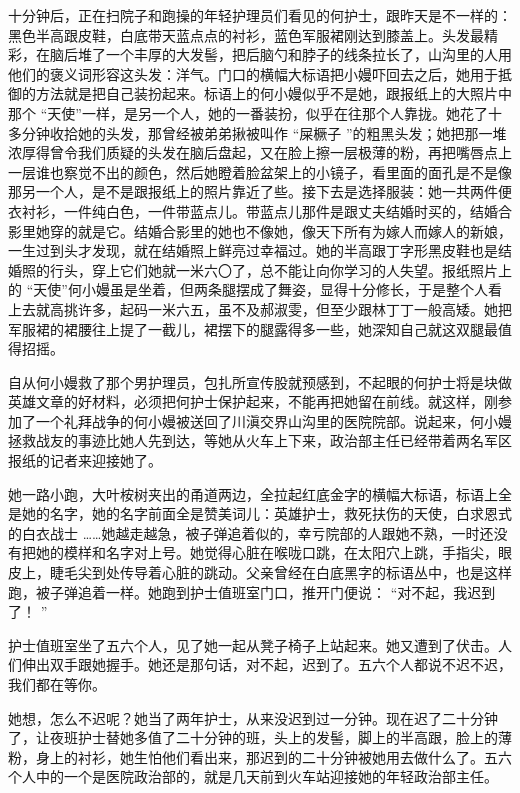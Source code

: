 \documentclass[12pt,twoside,openany]{book}
\begin{document}
十分钟后，正在扫院子和跑操的年轻护理员们看见的何护士，跟昨天是不一样的：黑色半高跟皮鞋，白底带天蓝点点的衬衫，蓝色军服裙刚达到膝盖上。头发最精彩，在脑后堆了一个丰厚的大发髻，把后脑勺和脖子的线条拉长了，山沟里的人用他们的褒义词形容这头发：洋气。门口的横幅大标语把小嫚吓回去之后，她用于抵御的方法就是把自己装扮起来。标语上的何小嫚似乎不是她，跟报纸上的大照片中那个 “天使”一样，是另一个人，她的一番装扮，似乎在往那个人靠拢。她花了十多分钟收拾她的头发，那曾经被弟弟揪被叫作 “屎橛子 ”的粗黑头发；她把那一堆浓厚得曾令我们质疑的头发在脑后盘起，又在脸上擦一层极薄的粉，再把嘴唇点上一层谁也察觉不出的颜色，然后她瞪着脸盆架上的小镜子，看里面的面孔是不是像那另一个人，是不是跟报纸上的照片靠近了些。接下去是选择服装：她一共两件便衣衬衫，一件纯白色，一件带蓝点儿。带蓝点儿那件是跟丈夫结婚时买的，结婚合影里她穿的就是它。结婚合影里的她也不像她，像天下所有为嫁人而嫁人的新娘，一生过到头才发现，就在结婚照上鲜亮过幸福过。她的半高跟丁字形黑皮鞋也是结婚照的行头，穿上它们她就一米六〇了，总不能让向你学习的人失望。报纸照片上的 “天使”何小嫚虽是坐着，但两条腿摆成了舞姿，显得十分修长，于是整个人看上去就高挑许多，起码一米六五，虽不及郝淑雯，但至少跟林丁丁一般高矮。她把军服裙的裙腰往上提了一截儿，裙摆下的腿露得多一些，她深知自己就这双腿最值得招摇。

自从何小嫚救了那个男护理员，包扎所宣传股就预感到，不起眼的何护士将是块做英雄文章的好材料，必须把何护士保护起来，不能再把她留在前线。就这样，刚参加了一个礼拜战争的何小嫚被送回了川滇交界山沟里的医院院部。说起来，何小嫚拯救战友的事迹比她人先到达，等她从火车上下来，政治部主任已经带着两名军区报纸的记者来迎接她了。

她一路小跑，大叶桉树夹出的甬道两边，全拉起红底金字的横幅大标语，标语上全是她的名字，她的名字前面全是赞美词儿：英雄护士，救死扶伤的天使，白求恩式的白衣战士 ……她越走越急，被子弹追着似的，幸亏院部的人跟她不熟，一时还没有把她的模样和名字对上号。她觉得心脏在喉咙口跳，在太阳穴上跳，手指尖，眼皮上，睫毛尖到处传导着心脏的跳动。父亲曾经在白底黑字的标语丛中，也是这样跑，被子弹追着一样。她跑到护士值班室门口，推开门便说： “对不起，我迟到了！ ”

护士值班室坐了五六个人，见了她一起从凳子椅子上站起来。她又遭到了伏击。人们伸出双手跟她握手。她还是那句话，对不起，迟到了。五六个人都说不迟不迟，我们都在等你。

她想，怎么不迟呢？她当了两年护士，从来没迟到过一分钟。现在迟了二十分钟了，让夜班护士替她多值了二十分钟的班，头上的发髻，脚上的半高跟，脸上的薄粉，身上的衬衫，她生怕他们看出来，那迟到的二十分钟被她用去做什么了。五六个人中的一个是医院政治部的，就是几天前到火车站迎接她的年轻政治部主任。
\end{document}
